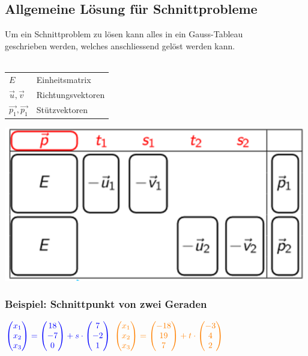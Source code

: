 		    
		    \vfill\null
		    \columnbreak


		    

		    
			\subsection{Allgemeine Lösung für Schnittprobleme}	
			Um ein Schnittproblem zu lösen kann alles in ein Gauss-Tableau \\
			geschrieben werden, welches anschliessend gelöst werden kann. \\
			\\
			\begin{tabular}{ll}
			$E$ & Einheitsmatrix  \\ 
			$\vec{u}, \vec{v}$ & Richtungsvektoren \\
			$\vec{p_1}, \vec{p_1} $ & Stützvektoren \\
			\end{tabular}
			
			\includegraphics[width=0.7\linewidth]{Bilder/schnittpunkt-tableau} 
			
			
			\subsubsection{Beispiel: Schnittpunkt von zwei Geraden}
			
			
		$\textcolor{blue}{\begin{pmatrix} x_1 \\ x_2 \\ x_3 \end{pmatrix} = \begin{pmatrix} 18 \\ -7 \\ 0 \end{pmatrix} + s \cdot \begin{pmatrix} 7 \\ -2 \\ 1\end{pmatrix}}$ \qquad $\textcolor{orange}{\begin{pmatrix} x_1 \\ x_2 \\ x_3 \end{pmatrix} = \begin{pmatrix} -18 \\ 19 \\ 7 \end{pmatrix} + t \cdot \begin{pmatrix} -3 \\ 4 \\ 2\end{pmatrix}}$ \\
		
